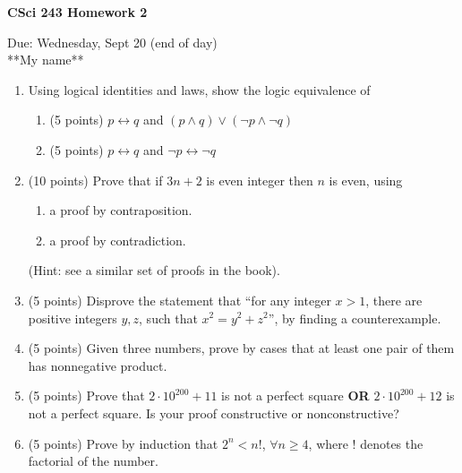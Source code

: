 \documentclass[11pt]{article}
\begin{document}
\begin{center}             %
\begin{LARGE}
{\bf CSci 243 Homework 2}
\end{LARGE}
\vskip 0.25cm      %

Due: Wednesday, Sept 20 (end of day)\\  %
**My name**
\end{center}

\begin{enumerate}
\item Using logical identities and laws, show the logic equivalence of
\begin{enumerate}
\item (5 points) $p\leftrightarrow q$
                        and $(p\land q)\lor(\lnot p\land \lnot q)$
\item (5 points) $p\leftrightarrow q$ and $\lnot p \leftrightarrow \lnot q$
\end{enumerate}


\item (10 points) Prove that if $3n+2$ is even integer then $n$ is even, using
\begin{enumerate}
\item a proof by contraposition.
\item a proof by contradiction.
\end{enumerate}
(Hint: see a similar set of proofs in the book).

\item (5 points) 
Disprove the statement that ``for any integer $x>1$, there are positive 
integers $y, z$, such that $x^2=y^2 + z^2$'', by finding a counterexample.

\item (5 points) 
Given three numbers, prove by cases that at least one pair of them has nonnegative product.

\item (5 points) Prove that $2\cdot 10^{200}+11$ is not a perfect square {\bf OR} $2\cdot 10^{200}+12$ is not a perfect square.
	Is your proof constructive or nonconstructive?


\item (5 points)
Prove by induction that $2^n < n!$, $\forall n \geq 4$, where ! denotes the factorial of the number.


\end{enumerate}
\end{document}
